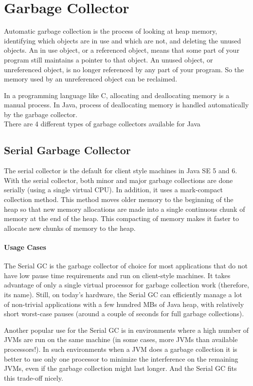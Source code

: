 \section{Garbage Collector}
\label{sec:gc}
Automatic garbage collection is the process of looking at heap memory, identifying which objects are in use and which are not, and deleting the unused objects. An in use object, or a referenced object, means that some part of your program still maintains a pointer to that object. An unused object, or unreferenced object, is no longer referenced by any part of your program. So the memory used by an unreferenced object can be reclaimed.

In a programming language like C, allocating and deallocating memory is a manual process. In Java, process of deallocating memory is handled automatically by the garbage collector.\cite{oracleGC}\\
There are 4 different types of garbage collectors available for Java
\subsection{Serial Garbage Collector}
The serial collector is the default for client style machines in Java SE 5 and 6. With the serial collector, both minor and major garbage collections are done serially (using a single virtual CPU). In addition, it uses a mark-compact collection method. This method moves older memory to the beginning of the heap so that new memory allocations are made into a single continuous chunk of memory at the end of the heap. This compacting of memory makes it faster to allocate new chunks of memory to the heap.\cite{oracleGC}
\paragraph{Usage Cases}
The Serial GC is the garbage collector of choice for most applications that do not have low pause time requirements and run on client-style machines. It takes advantage of only a single virtual processor for garbage collection work (therefore, its name). Still, on today's hardware, the Serial GC can efficiently manage a lot of non-trivial applications with a few hundred MBs of Java heap, with relatively short worst-case pauses (around a couple of seconds for full garbage collections).

Another popular use for the Serial GC is in environments where a high number of JVMs are run on the same machine (in some cases, more JVMs than available processors!). In such environments when a JVM does a garbage collection it is better to use only one processor to minimize the interference on the remaining JVMs, even if the garbage collection might last longer. And the Serial GC fits this trade-off nicely.

